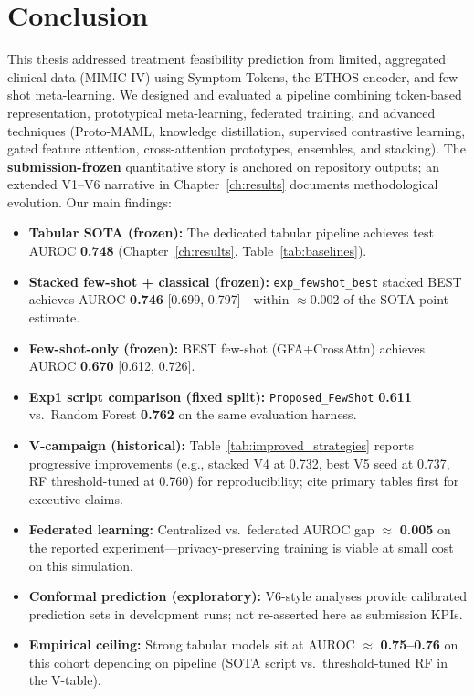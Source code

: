 \chapter{Conclusion}
\label{ch:conclusion}

This thesis addressed treatment feasibility prediction from limited, aggregated clinical data (MIMIC-IV) using Symptom Tokens, the ETHOS encoder, and few-shot meta-learning. We designed and evaluated a pipeline combining token-based representation, prototypical meta-learning, federated training, and advanced techniques (Proto-MAML, knowledge distillation, supervised contrastive learning, gated feature attention, cross-attention prototypes, ensembles, and stacking). The \textbf{submission-frozen} quantitative story is anchored on repository outputs; an extended V1--V6 narrative in Chapter~\ref{ch:results} documents methodological evolution. Our main findings:

\begin{itemize}
\item \textbf{Tabular SOTA (frozen):} The dedicated tabular pipeline achieves test AUROC \textbf{0.748} (Chapter~\ref{ch:results}, Table~\ref{tab:baselines}).
\item \textbf{Stacked few-shot + classical (frozen):} \texttt{exp\_fewshot\_best} stacked BEST achieves AUROC \textbf{0.746} [0.699, 0.797]---within $\approx$0.002 of the SOTA point estimate.
\item \textbf{Few-shot-only (frozen):} BEST few-shot (GFA+CrossAttn) achieves AUROC \textbf{0.670} [0.612, 0.726].
\item \textbf{Exp1 script comparison (fixed split):} \texttt{Proposed\_FewShot} \textbf{0.611} vs.\ Random Forest \textbf{0.762} on the same evaluation harness.
\item \textbf{V-campaign (historical):} Table~\ref{tab:improved_strategies} reports progressive improvements (e.g., stacked V4 at 0.732, best V5 seed at 0.737, RF threshold-tuned at 0.760) for reproducibility; cite primary tables first for executive claims.
\item \textbf{Federated learning:} Centralized vs.\ federated AUROC gap $\approx$ \textbf{0.005} on the reported experiment---privacy-preserving training is viable at small cost on this simulation.
\item \textbf{Conformal prediction (exploratory):} V6-style analyses provide calibrated prediction sets in development runs; not re-asserted here as submission KPIs.
\item \textbf{Empirical ceiling:} Strong tabular models sit at AUROC $\approx$ \textbf{0.75--0.76} on this cohort depending on pipeline (SOTA script vs.\ threshold-tuned RF in the V-table).
\end{itemize}

